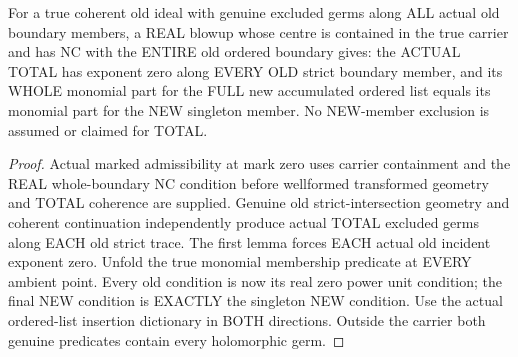 \begin{theorem}
\label{hir:sharp-actual-total-whole-accumulated-monomial-equals-new}
\leanok
For a true coherent old ideal with genuine excluded germs along ALL actual
old boundary members, a REAL blowup whose centre is contained in the true
carrier and has NC with the ENTIRE old ordered boundary gives: the ACTUAL
TOTAL has exponent zero along EVERY OLD strict boundary member, and its
WHOLE monomial part for the FULL new accumulated ordered list equals its
monomial part for the NEW singleton member. No NEW-member exclusion is
assumed or claimed for TOTAL.
\end{theorem}
\begin{proof}
Actual marked admissibility at mark zero uses carrier containment and the
REAL whole-boundary NC condition before wellformed transformed geometry
and TOTAL coherence are supplied. Genuine old strict-intersection geometry
and coherent continuation independently produce actual TOTAL excluded
germs along EACH old strict trace. The first lemma forces EACH actual old
incident exponent zero. Unfold the true monomial membership predicate at
EVERY ambient point. Every old condition is now its real zero power unit
condition; the final NEW condition is EXACTLY the singleton NEW condition.
Use the actual ordered-list insertion dictionary in BOTH directions.
Outside the carrier both genuine predicates contain every holomorphic germ.
\end{proof}

